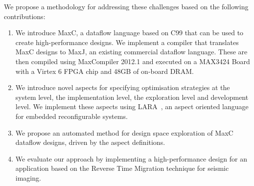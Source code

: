 We propose a methodology for addressing these challenges based on the
following contributions:
\begin{enumerate}
\item We introduce MaxC, a dataflow language based on C99 that can be
  used to create high-performance designs. We implement a compiler
  that translates MaxC designs to MaxJ, an existing commercial dataflow
  language. These are then compiled using MaxCompiler 2012.1 and
  executed on a MAX3424 Board with a Virtex 6 FPGA chip and 48GB of
  on-board DRAM.
\item We introduce novel aspects for specifying optimisation
  strategies at the system level, the implementation level, the
  exploration level and development level. We implement these aspects
  using
  LARA~\cite{Cardoso:Carvalho:Cutinho:Luk:Nobre:Diniz:Petrov:2012}, an
  aspect oriented language for embedded reconfigurable systems.
\item We propose an automated method for design space exploration of
  MaxC dataflow designs, driven by the aspect definitions.
\item We evaluate our approach by implementing a high-performance
  design for an application based on the Reverse Time Migration
  technique for seismic imaging.
\end{enumerate}
